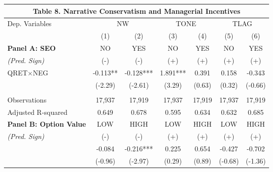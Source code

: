 \begin{table}[H] \label{T8}
  \begin{center}
  	\begin{tabular}{lcccccc}
  		\multicolumn{7}{c}{\textbf{Table 8. Narrative Conservatism and Managerial Incentives}} \\
  		\midrule
  		\midrule
  		Dep. Variables & \multicolumn{2}{c}{NW} & \multicolumn{2}{c}{TONE} & \multicolumn{2}{c}{TLAG}\\
  		& (1) & (2) & (3) & (4) & (5) & (6) \\
  		\midrule
  		\multicolumn{1}{l}{\textbf{Panel A: SEO}} & NO & YES & NO & YES & NO & YES \\
  		\cmidrule{2-7}
  		\rowcolor[rgb]{ .933,  .925,  .882} \textit{(Pred. Sign)} & (-) & (-) & (+) & (+) & (+) & (+) \\
  		\rowcolor[rgb]{ .933,  .925,  .882} QRET$\times$NEG & -0.113** & -0.128*** & 1.891*** & 0.391 & 0.158 & -0.343 \\
  		\rowcolor[rgb]{ .933,  .925,  .882} & (-2.29) & (-2.61) & (3.29) & (0.63) & (0.32) & (-0.66) \\
  		&  &  &  &  &  &  \\
  		Observations & 17,937 & 17,919 & 17,937 & 17,919 & 17,937 & 17,919 \\
  		Adjusted R-squared & 0.649 & 0.678 & 0.595 & 0.634 & 0.632 & 0.685 \\
  		\midrule
  		\multicolumn{1}{l}{\textbf{Panel B: Option Value}} & LOW & HIGH & LOW & HIGH & LOW & HIGH \\
  		\cmidrule{2-7}
  		\rowcolor[rgb]{ .933,  .925,  .882} \textit{(Pred. Sign)} & (-) & (-) & (+) & (+) & (+) & (+) \\
  		\rowcolor[rgb]{ .933,  .925,  .882} \multicolumn{1}{l}{QRET$\times$NEG} & -0.084 & -0.216*** & 0.225 & 0.654 & -0.427 & -0.702 \\
  		\rowcolor[rgb]{ .933,  .925,  .882} & (-0.96) & (-2.97) & (0.29) & (0.89) & (-0.68) & (-1.36) \\

\end{tabular}
\end{center}
\end{table}
